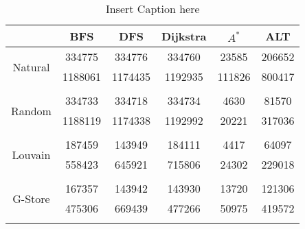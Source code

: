 \begin{table}
	\begin{center}
		 \begin{tabular}[c]{c c c c c c} \toprule
			  & BFS & DFS & Dijkstra & $A^*$  & ALT \\ \midrule 
 			\multirow{2}{*}{Natural}  & 334775 & 334776 & 334760 & 23585 & 206652 \\ 
 				 & 1188061 & 1174435 & 1192935 & 111826 & 800417 \\ 
 				&&&&& \\[-0.5em]
 			\multirow{2}{*}{Random}  & 334733 & 334718 & 334734 & 4630 & 81570 \\ 
 				 & 1188119 & 1174338 & 1192992 & 20221 & 317036 \\ 
 				&&&&& \\[-0.5em]
 			\multirow{2}{*}{Louvain}  & 187459 & 143949 & 184111 & 4417 & 64097 \\ 
 				 & 558423 & 645921 & 715806 & 24302 & 229018 \\ 
 				&&&&& \\[-0.5em]
 			\multirow{2}{*}{G-Store}  & 167357 & 143942 & 143930 & 13720 & 121306 \\ 
 				 & 475306 & 669439 & 477266 & 50975 & 419572 \\ 
 				&&&&& \\[-0.5em]
 					\end{tabular}  
  	 \end{center}
	 \caption{ Insert Caption here}
\end{table}